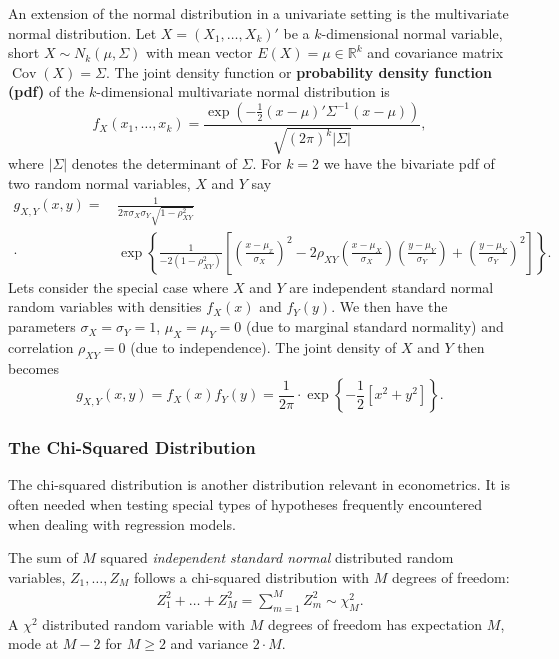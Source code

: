 \documentclass[
  14pt,
]{memoir}
\begin{document}
An extension of the normal distribution in a univariate setting is the multivariate normal distribution. Let \(X=(X_1,\dots,X_k)'\) be a \(k\)-dimensional normal variable, short \(X\sim N_k(\mu,\Sigma)\) with mean vector \(E(X)=\mu\in\mathbb{R}^k\) and covariance matrix \(\operatorname{Cov}(X)=\Sigma\). The joint density function or \textbf{probability density function (pdf)} of the \(k\)-dimensional multivariate normal distribution is
\[
f_{X}\left(x_{1}, \ldots, x_{k}\right)=\frac{\exp \left(-\frac{1}{2}(x-\mu)' \Sigma^{-1}(x-\mu)\right)}{\sqrt{(2 \pi)^{k}|\Sigma|}},
\]
where \(|\Sigma|\) denotes the determinant of \(\Sigma\). For \(k=2\) we have the bivariate pdf of two random normal variables, \(X\) and \(Y\) say
\begin{align*}
g_{X,Y}(x,y) =& \, \frac{1}{2\pi\sigma_X\sigma_Y\sqrt{1-\rho_{XY}^2}} \\ 
\cdot & \, \exp \left\{ \frac{1}{-2(1-\rho_{XY}^2)} \left[ \left( \frac{x-\mu_x}{\sigma_X} \right)^2 - 2\rho_{XY}\left( \frac{x-\mu_X}{\sigma_X} \right)\left( \frac{y-\mu_Y}{\sigma_Y} \right) + \left( \frac{y-\mu_Y}{\sigma_Y} \right)^2 \right]  \right\}.
\end{align*}
Lets consider the special case where \(X\) and \(Y\) are independent standard normal random variables with densities \(f_X(x)\) and \(f_Y(y)\). We then have the parameters \(\sigma_X = \sigma_Y = 1\), \(\mu_X=\mu_Y=0\) (due to marginal standard normality) and correlation \(\rho_{XY}=0\) (due to independence). The joint density of \(X\) and \(Y\) then becomes
\[
g_{X,Y}(x,y) = f_X(x) f_Y(y) = \frac{1}{2\pi} \cdot \exp \left\{ -\frac{1}{2}\left[x^2 + y^2\right]\right\}.
\]

\hypertarget{chisqdist}{%
\subsubsection{The Chi-Squared Distribution}\label{chisqdist}}

The chi-squared distribution is another distribution relevant in econometrics. It is often needed when testing special types of hypotheses frequently encountered when dealing with regression models.

The sum of \(M\) squared \emph{independent standard normal} distributed random variables, \(Z_1,\dots,Z_M\) follows a chi-squared distribution with \(M\) degrees of freedom:
\begin{align*}
Z_1^2 + \dots + Z_M^2 = \sum_{m=1}^M Z_m^2 \sim \chi^2_M. 
\end{align*}
A \(\chi^2\) distributed random variable with \(M\) degrees of freedom has expectation \(M\), mode at \(M-2\) for \(M \geq 2\) and variance \(2 \cdot M\).
\end{document}
